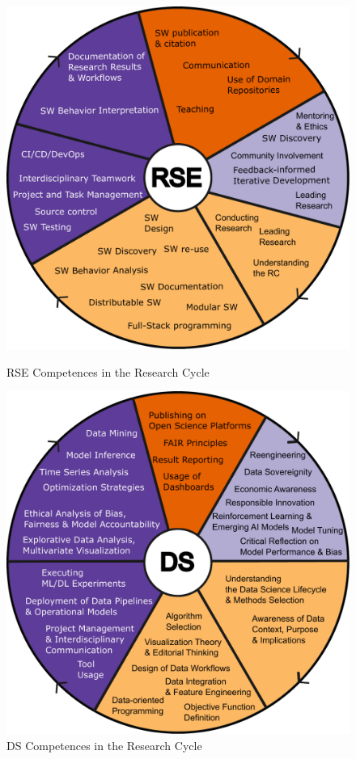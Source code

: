 \documentclass[
        english,biblatex
    ]{lni}
\begin{document}
    \begin{figure}[h!]
    \centering
    \begin{minipage}{0.48\textwidth}
    \centering
    \includegraphics[width=\linewidth]{img/RC_RSE_competences.pdf}
    \caption{RSE Competences in the Research Cycle}
    \label{fig:rc_rse}
    \end{minipage}\hfill
    \begin{minipage}{0.48\textwidth}
    \centering
    \includegraphics[width=\linewidth]{img/RC_DS_competences.pdf}
    \caption{DS Competences in the Research Cycle}
    \label{fig:rc_ds}
    \end{minipage}
    \end{figure}
\end{document}
